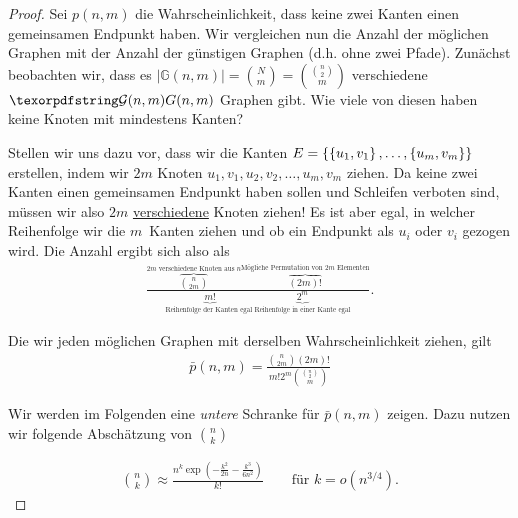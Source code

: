\begin{proof}
    Sei $p(n,m)$ die Wahrscheinlichkeit, dass keine zwei Kanten einen gemeinsamen Endpunkt haben.
    Wir vergleichen nun die Anzahl der möglichen Graphen mit der Anzahl der günstigen Graphen (d.h. ohne zwei Pfade).
    Zunächst beobachten wir, dass es $|\mathbb G(n,m)| = \binom N m = \binom{\binom n 2}{m}$ verschiedene $\Gnm$ Graphen gibt.
    Wie viele von diesen haben keine Knoten mit mindestens Kanten?

    Stellen wir uns dazu vor, dass wir die Kanten $E = \left\{\left\{u_1, v_1\right\}, \ldots, \left\{u_m, v_m\right\}\right\}$ erstellen, indem wir $2m$ Knoten $u_1, v_1, u_2, v_2, \ldots, u_m, v_m$ ziehen.
    Da keine zwei Kanten einen gemeinsamen Endpunkt haben sollen und Schleifen verboten sind, müssen wir also $2m$ \underline{verschiedene} Knoten ziehen!
    Es ist aber egal, in welcher Reihenfolge wir die $m$~Kanten ziehen und ob ein Endpunkt als $u_i$ oder $v_i$ gezogen wird.
    Die Anzahl ergibt sich also als
    \begin{align}
        \frac{
            \overbrace{\binom{n}{2m}}^\text{$2m$ verschiedene Knoten aus $n$}
            \overbrace{(2m)!}^\text{Mögliche Permutation von $2m$ Elementen}
        }{
            \underbrace{m!}_\text{Reihenfolge der Kanten egal\ \ \ }
            \underbrace{2^m}_\text{Reihenfolge in einer Kante egal}
        }.
    \end{align}

    \noindent
    Die wir jeden möglichen Graphen mit derselben Wahrscheinlichkeit ziehen, gilt
    \begin{align}
        \bar p(n, m) = \frac{\binom{n}{2m} (2m)!}{m! 2^m \binom{\binom n 2}{m}} \label{eq:wkeit_keine_zwei_kanten}
    \end{align}

    \noindent
    Wir werden im Folgenden eine \emph{untere} Schranke für $\bar p(n,m)$ zeigen.
    Dazu nutzen wir folgende Abschätzung von $\binom n k$

    \begin{align}
        \binom n k \approx \frac{n^k \exp\left(-\frac{k^2}{2n} - \frac{k^3}{6n^2}\right)}{k!}
        \quad\quad \text{für } k = o(n^{3/4}).
    \end{align}


\end{proof}
